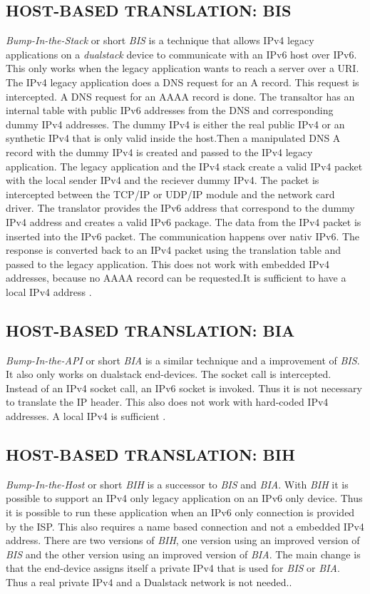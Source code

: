 \documentclass[format=sigconf, natbib=true, nonacm=true]{acmart}
\begin{document}
    \subsection{HOST-BASED TRANSLATION: BIS}
    \textit{Bump-In-the-Stack} or short \textit{BIS} is a technique that allows IPv4 legacy applications on a \textit{dualstack} device to communicate with an IPv6 host over IPv6. This only works when the legacy application wants to reach a server over a URI. The IPv4 legacy application does a DNS request for an A record. This request is intercepted. A DNS request for an AAAA record is done. The transaltor has an internal table with public IPv6 addresses from the DNS and corresponding dummy IPv4 addresses. The dummy IPv4 is either the real public IPv4 or an synthetic IPv4 that is only valid inside the host.Then a manipulated DNS A record with the dummy IPv4 is created and passed to the IPv4 legacy application. The legacy application and the IPv4 stack create a valid IPv4 packet with the local sender IPv4 and the reciever dummy IPv4. The packet is intercepted between the TCP/IP or UDP/IP module and the network card driver. The translator provides the IPv6 address that correspond to the dummy IPv4 address and creates a valid IPv6 package. The data from the IPv4 packet is inserted into the IPv6 packet. The communication happens over nativ IPv6. The response is converted back to an IPv4 packet using the translation table and passed to the legacy application. This does not work with embedded IPv4 addresses, because no AAAA record can be requested.It is sufficient to have a local IPv4 address\cite{8716482} \cite{rfc2767}.
    \subsection{HOST-BASED TRANSLATION: BIA}
    \textit{Bump-In-the-API} or short \textit{BIA} is a similar technique and a improvement of \textit{BIS}. It also only works on dualstack end-devices. The socket call is intercepted. Instead of an IPv4 socket call, an IPv6 socket is invoked. Thus it is not necessary to translate the IP header. This also does not work with hard-coded IPv4 addresses. A local IPv4 is sufficient\cite{8716482} \cite{rfc3338}.
    \subsection{HOST-BASED TRANSLATION: BIH}
    \textit{Bump-In-the-Host} or short \textit{BIH} is a successor to \textit{BIS} and \textit{BIA}. With \textit{BIH} it is possible to support an IPv4 only legacy application on an IPv6 only device. Thus it is possible to run these application when an IPv6 only connection is provided by the ISP. This also requires a name based connection and not a embedded IPv4 address. There are two versions of \textit{BIH}, one version using an improved version of \textit{BIS} and the other version using an improved version of \textit{BIA}. The main change is that the end-device assigns itself a private IPv4 that is used for \textit{BIS} or \textit{BIA}. Thus a real private IPv4 and a Dualstack network is not needed.\cite{8716482}\cite{rfc6535}. 
\end{document}
